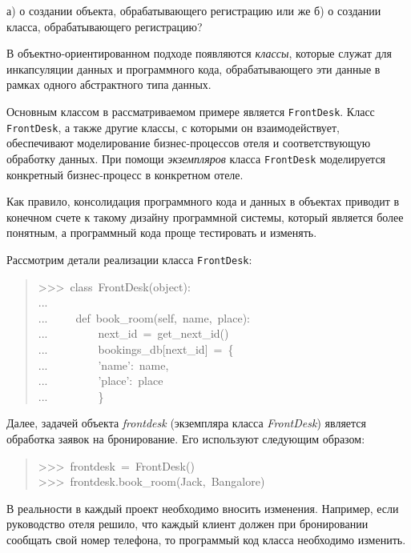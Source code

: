 \documentclass[14pt,a4paper,openany,twoside,final]{extbook}
\providecommand*{\DUroletitlereference}[1]{\textsl{#1}}
\begin{document}
а) \textquotedbl{}о создании объекта, обрабатывающего регистрацию\textquotedbl{} или же
б) \textquotedbl{}о создании класса, обрабатывающего регистрацию\textquotedbl{}?

В объектно-ориентированном подходе появляются \DUroletitlereference{классы}, которые служат
для инкапсуляции данных и программного кода, обрабатывающего эти
данные в рамках одного абстрактного типа данных.

Основным классом в рассматриваемом примере является \texttt{FrontDesk}.
Класс \texttt{FrontDesk}, а также другие классы, с которыми он
взаимодействует, обеспечивают моделирование бизнес-процессов отеля и
соответствующую обработку данных.  При помощи \DUroletitlereference{экземпляров} класса
\texttt{FrontDesk} моделируется конкретный бизнес-процесс в конкретном
отеле.

Как правило, консолидация программного кода и данных в объектах
приводит в конечном счете к такому дизайну программной системы,
который является более понятным, а программный кода проще тестировать
и изменять.

Рассмотрим детали реализации класса \texttt{FrontDesk}:

\begin{quote}{\ttfamily \raggedright \noindent
>{}>{}>~class~FrontDesk(object):\\
...\\
...~~~~~def~book\_room(self,~name,~place):\\
...~~~~~~~~~next\_id~=~get\_next\_id()\\
...~~~~~~~~~bookings\_db{[}next\_id{]}~=~\{\\
...~~~~~~~~~'name':~name,\\
...~~~~~~~~~'place':~place\\
...~~~~~~~~~\}
}
\end{quote}

Далее, задачей объекта \DUroletitlereference{frontdesk} (экземпляра класса \DUroletitlereference{FrontDesk})
является обработка заявок на бронирование.  Его используют следующим
образом:

\begin{quote}{\ttfamily \raggedright \noindent
>{}>{}>~frontdesk~=~FrontDesk()\\
>{}>{}>~frontdesk.book\_room(\textquotedbl{}Jack\textquotedbl{},~\textquotedbl{}Bangalore\textquotedbl{})
}
\end{quote}

В реальности в каждый проект необходимо вносить изменения.  Например,
если руководство отеля решило, что каждый клиент должен при
бронировании сообщать свой номер телефона, то программый код класса
необходимо изменить.
\end{document}
